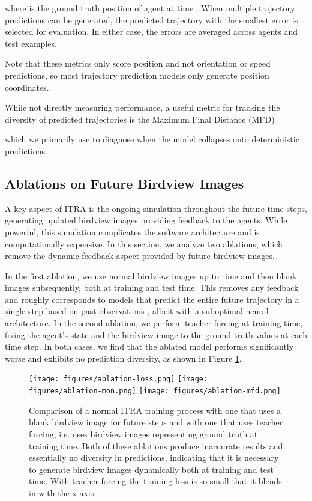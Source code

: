\documentclass[letterpaper, 10 pt, conference]{ieeeconf}
\begin{document}
where  is the ground truth position of agent  at time . When multiple trajectory predictions can be generated, the predicted trajectory with the smallest error is selected for evaluation. In either case, the errors are averaged across agents and test examples.

Note that these metrics only score position and not orientation or speed predictions, so most trajectory prediction models only generate position coordinates.

While not directly measuring performance, a useful metric for tracking the diversity of predicted trajectories is the Maximum Final Distance (MFD)

which we primarily use to diagnose when the model collapses onto deterministic predictions.


\subsection{Ablations on Future Birdview Images}

A key aspect of ITRA is the ongoing simulation throughout the future time steps, generating updated birdview images providing feedback to the agents. While powerful, this simulation complicates the software architecture and is computationally expensive. In this section, we analyze two ablations, which remove the dynamic feedback aspect provided by future birdview images.

In the first ablation, we use normal birdview images up to time  and then blank images subsequently, both at training and test time. This removes any feedback and roughly corresponds to models that predict the entire future trajectory in a single step based on past observations \cite{lee_desire_2017, sadeghian_sophie_2018, gupta_social_2018, zhao_multi-agent_2019, zhao_tnt_2020}, albeit with a suboptimal neural architecture. In the second ablation, we perform teacher forcing at training time, fixing the agent's state and the birdview image to the ground truth values at each time step. In both cases, we find that the ablated model performs significantly worse and exhibits no prediction diversity, as shown in Figure \ref{fig:ablations}.

\begin{figure}
    \centering
    \texttt{[image: figures/ablation-loss.png]}
    \texttt{[image: figures/ablation-mon.png]}
    \texttt{[image: figures/ablation-mfd.png]}
    \caption{Comparison of a normal ITRA training process with one that uses a blank birdview image for future steps and with one that uses teacher forcing, i.e. uses birdview images representing ground truth at training time. Both of these ablations produce inaccurate results and essentially no diversity in predictions, indicating that it is necessary to generate birdview images dynamically both at training and test time. With teacher forcing the training loss is so small that it blends in with the x axis.}
    \label{fig:ablations}
\end{figure}
\end{document}

